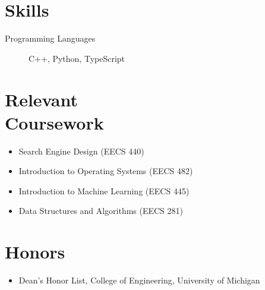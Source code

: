 \documentclass{mycv}
\begin{document}

\section{Skills}

\begin{description}
  \item[Programming Languages] C++, Python, TypeScript
\end{description}

\section{Relevant\\Coursework}
\begin{itemize}
  \item Search Engine Design (EECS 440)
  \item Introduction to Operating Systems (EECS 482)
  \item Introduction to Machine Learning (EECS 445)
  \item Data Structures and Algorithms (EECS 281)
\end{itemize}

\section{Honors}
\begin{itemize}
  \item Dean's Honor List, College of Engineering, University of Michigan
\end{itemize}
\end{document}
